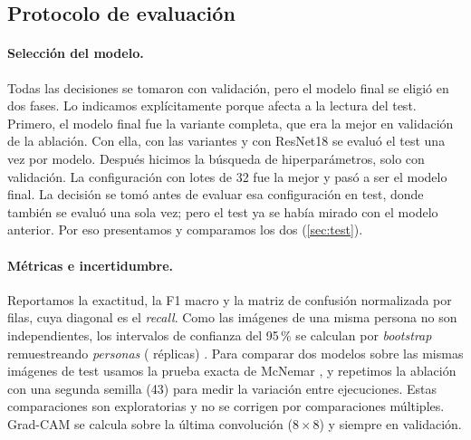 \subsection{Protocolo de evaluación}
\label{sec:protocolo}

\paragraph{Selección del modelo.}
Todas las decisiones se tomaron con validación, pero el modelo final se eligió en dos fases. Lo
indicamos explícitamente porque afecta a la lectura del test. Primero, el modelo final fue la
variante completa, que era la mejor en validación de la ablación. Con ella, con las variantes y
con ResNet18 se evaluó el test una vez por modelo. Después hicimos la búsqueda de
hiperparámetros, solo con validación. La configuración con lotes de 32 fue la mejor y pasó a ser el
modelo final. La decisión se tomó antes de evaluar esa configuración en test, donde también se
evaluó una sola vez; pero el test ya se había mirado con el modelo anterior. Por eso presentamos
y comparamos los dos (\cref{sec:test}).

\paragraph{Métricas e incertidumbre.}
Reportamos la exactitud, la F1 macro y la matriz de confusión normalizada por filas, cuya
diagonal es el \emph{recall}. Como las imágenes de una misma persona no son independientes, los
intervalos de confianza del 95\,\% se calculan por \emph{bootstrap} remuestreando \emph{personas}
(\NBoot{} réplicas) \citep{efron1993bootstrap}. Para comparar dos modelos sobre las mismas
imágenes de test usamos la prueba exacta de McNemar \citep{mcnemar1947,dietterich1998tests}, y
repetimos la ablación con una segunda semilla (43) para medir la variación entre ejecuciones.
Estas comparaciones son exploratorias y no se corrigen por comparaciones múltiples. Grad-CAM
\citep{selvaraju2017gradcam} se calcula sobre la última convolución ($8\times8$) y siempre en
validación.
